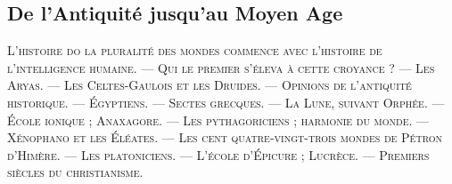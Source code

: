 \documentclass[a4paper, 11pt, oneside, landscape]{article}
\begin{document}
\bigskip

\subsection{De l'Antiquité jusqu'au Moyen Age}
\begin{center}
\scshape
\small
L'histoire do la pluralité des mondes commence avec l'histoire de l'intelligence humaine. --- Qui le premier s'éleva à cette croyance ? --- Les Aryas. --- Les Celtes-Gaulois et les Druides. --- Opinions de l'antiquité historique. --- Égyptiens. --- Sectes grecques. --- La Lune, suivant Orphée. --- École ionique ; Anaxagore. --- Les pythagoriciens ; harmonie du monde. --- Xénophano et les Éléates. --- Les cent quatre-vingt-trois mondes de Pétron d'Himère. --- Les platoniciens. --- L'école d'Épicure ; Lucrèce. --- Premiers siècles du christianisme.
\end{center}
\end{document}
